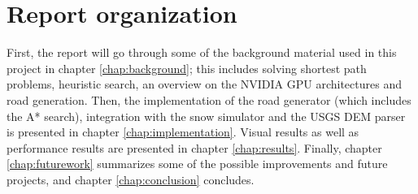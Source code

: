 \section{Report organization}
First, the report will go through some of the background material used in this project in chapter \ref{chap:background}; this includes solving shortest path problems, heuristic search, an overview on the NVIDIA GPU architectures and road generation. Then, the implementation of the road generator (which includes the A* search), integration with the snow simulator and the USGS DEM parser is presented in chapter \ref{chap:implementation}. Visual results as well as performance results are presented in chapter \ref{chap:results}. Finally, chapter \ref{chap:futurework} summarizes some of the possible improvements and future projects, and chapter \ref{chap:conclusion} concludes.
